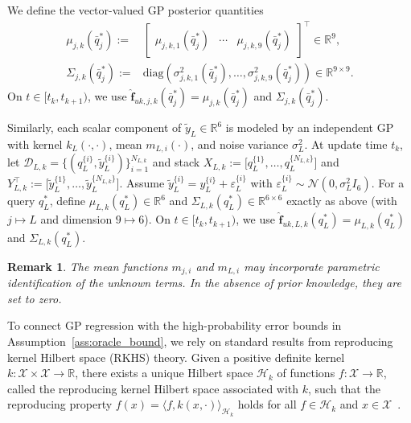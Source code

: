 \documentclass[letterpaper, 10 pt, conference]{ieeeconf}  %
\newcommand{\0}{\matr{0}}
\newtheorem{remark}{Remark}
\begin{document}
We define the vector-valued GP posterior quantities
\begin{align*}
\mu_{j,k}(\bar q_j^*) :=&
\begin{bmatrix}
\mu_{j,k,1}(\bar q_j^*) & \cdots & \mu_{j,k,9}(\bar q_j^*)
\end{bmatrix}^{\top}\in\mathbb R^{9},\\
\Sigma_{j,k}(\bar q_j^*) :=&
\mathrm{diag}\!\left(\sigma^2_{j,k,1}(\bar q_j^*),\ldots,\sigma^2_{j,k,9}(\bar q_j^*)\right)\in\mathbb R^{9\times 9}.
\end{align*}
On $t\in[t_k,t_{k+1})$, we use $\hat{\mathbf f}_{uk,j,k}(\bar q_j^*)=\mu_{j,k}(\bar q_j^*)$ and $\Sigma_{j,k}(\bar q_j^*)$.

Similarly, each scalar component of $\tilde y_L\in\mathbb R^6$ is modeled by an independent GP with kernel $k_L(\cdot,\cdot)$,
mean $m_{L,i}(\cdot)$, and noise variance $\sigma_L^2$.
At update time $t_k$, let $\mathcal D_{L,k}=\{(q_L^{\{i\}},\tilde y_L^{\{i\}})\}_{i=1}^{N_{L,k}}$ and stack $X_{L,k}:=\big[q_L^{\{1\}},\ldots,q_L^{\{N_{L,k}\}}\big]$ and 
$Y_{L,k}^\top:=\big[\tilde y_L^{\{1\}},\ldots,\tilde y_L^{\{N_{L,k}\}}\big]$. Assume $\tilde y_L^{\{i\}} = y_L^{\{i\}} + \varepsilon_{L}^{\{i\}}$ with $\varepsilon_{L}^{\{i\}}\sim\mathcal N(0,\sigma_L^2 I_6)$.
For a query $q_L^*$, define $\mu_{L,k}(q_L^*)\in\mathbb R^6$ and $\Sigma_{L,k}(q_L^*)\in\mathbb R^{6\times 6}$ exactly as above
(with $j\mapsto L$ and dimension $9\mapsto 6$). On $t\in[t_k,t_{k+1})$, we use
$\hat{\mathbf f}_{uk,L,k}(q_L^*)=\mu_{L,k}(q_L^*)$ and $\Sigma_{L,k}(q_L^*)$.

\begin{remark}
The mean functions $m_{j,i}$ and $m_{L,i}$ may incorporate parametric identification of the unknown terms.
In the absence of prior knowledge, they are set to zero.
\end{remark}


To connect GP regression with the high-probability error bounds in Assumption~\ref{ass:oracle_bound},
we rely on standard results from reproducing kernel Hilbert space (RKHS) theory.
Given a positive definite kernel $k:\mathcal X\times\mathcal X\rightarrow\mathbb R$,
there exists a unique Hilbert space $\mathcal H_k$ of functions $f:\mathcal X\rightarrow\mathbb R$,
called the reproducing kernel Hilbert space associated with $k$,
such that the reproducing property
$f(x)=\langle f,k(x,\cdot)\rangle_{\mathcal H_k}$
holds for all $f\in\mathcal H_k$ and $x\in\mathcal X$~\cite{wahba1990spline,steinwart2008support}.
\end{document}
